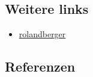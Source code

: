 \documentclass[
]{book}
\providecommand{\tightlist}{%
  \setlength{\itemsep}{0pt}\setlength{\parskip}{0pt}}
\begin{document}
\hypertarget{weitere-links-5}{%
\subsection*{Weitere links}\label{weitere-links-5}}

\begin{itemize}
\tightlist
\item
  \href{https://www.rolandberger.com/en/Insights/Publications/Drones-The-future-of-asset-inspection.html}{rolandberger}
\end{itemize}

\hypertarget{referenzen-7}{%
\subsection*{Referenzen}\label{referenzen-7}}
\end{document}
